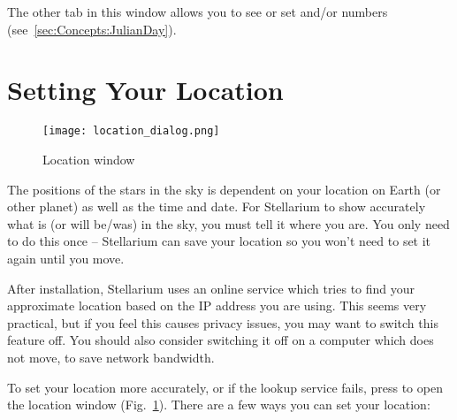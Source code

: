 The other tab in this window allows you to see or set
 and/or  numbers
(see~\ref{sec:Concepts:JulianDay}).

\section{Setting Your Location}
\label{sec:gui:location}

\begin{figure}[htbp]
\centering\texttt{[image: location\_dialog.png]}
\caption{Location window}
\label{fig:gui:location}
\end{figure}

\noindent The positions of the stars in the sky is dependent on your location on
Earth (or other planet) as well as the time and date. For Stellarium to
show accurately what is (or will be/was) in the sky, you must tell it
where you are. You only need to do this once -- Stellarium can save your
location so you won't need to set it again until you move.

After installation, Stellarium uses an online service which tries to
find your approximate location based on the IP address you are
using. This seems very practical, but if you feel this causes privacy
issues, you may want to switch this feature off. You should also consider 
switching it off on a computer which does not move, to save network bandwidth.

To set your location more accurately, or if the lookup service fails,
press  to open the location window (Fig.~\ref{fig:gui:location}). 
There are a few ways you can set your location:

